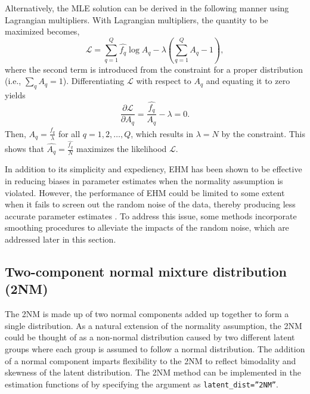 Alternatively, the MLE solution can be derived in the following manner
using Lagrangian multipliers. With Lagrangian multipliers, the
quantity to be maximized becomes,
\begin{equation}
\mathcal{L} = \sum_{q = 1}^{Q}{ \hat{f_{q}} \log{A_{q}} } -
\lambda \left( \sum_{q = 1}^{Q}{A_{q}} - 1 \right),
\label{eq:ehmmle}
\end{equation}
where the second term is introduced from the constraint for a proper
distribution (i.e., \(\sum_{q}{A_{q}} = 1\)). Differentiating
\(\mathcal{L}\) with respect to \(A_{q}\) and equating it to zero yields
\begin{equation}
\frac{\partial \mathcal{L}}{\partial A_{q}} =
\frac{\hat{f_{q}}}{A_{q}} - \lambda = 0.
\label{eq:ehmdiffern}
\end{equation}
Then, \(A_{q} = \frac{\hat{f_{q}}}{\lambda}\) for all
\(q = 1, 2, \dots, Q\), which results in \(\lambda = N\) by the constraint.
This shows that \(\hat{ A_{q}} = \frac{\hat{f_{q}}}{N}\) maximizes the
likelihood \(\mathcal{L}\).

In addition to its simplicity and expediency, EHM has been shown to
be effective in reducing biases in parameter estimates when the
normality assumption is violated. However, the performance of EHM could be
limited to some extent when it fails to screen out the random noise of the data,
thereby producing less accurate parameter estimates \citep{Li:2021, Woods:2015, Woods+Lin:2009}. To address this issue, some methods incorporate smoothing
procedures to alleviate the impacts of the random noise, which are
addressed later in this section.

\hypertarget{two-component-normal-mixture-distribution-2nm}{%
\subsection{Two-component normal mixture distribution (2NM)}\label{two-component-normal-mixture-distribution-2nm}}

The 2NM is made up of two normal components added up together to form a
single distribution. As a natural extension of the normality assumption,
the 2NM could be thought of as a non-normal distribution caused by two
different latent groups where each group is assumed to follow a normal
distribution. The addition of a normal component imparts flexibility to
the 2NM to reflect bimodality and skewness of the latent
distribution. The 2NM method can be implemented in the estimation
functions of  by specifying the argument as \texttt{latent\_dist=”2NM”}.

